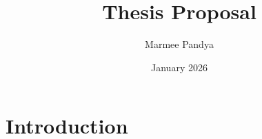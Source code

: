 \documentclass{article}
\title{Thesis Proposal}
\author{Marmee Pandya}
\date{January 2026}
\begin{document}
\maketitle

\section{Introduction}
\end{document}
